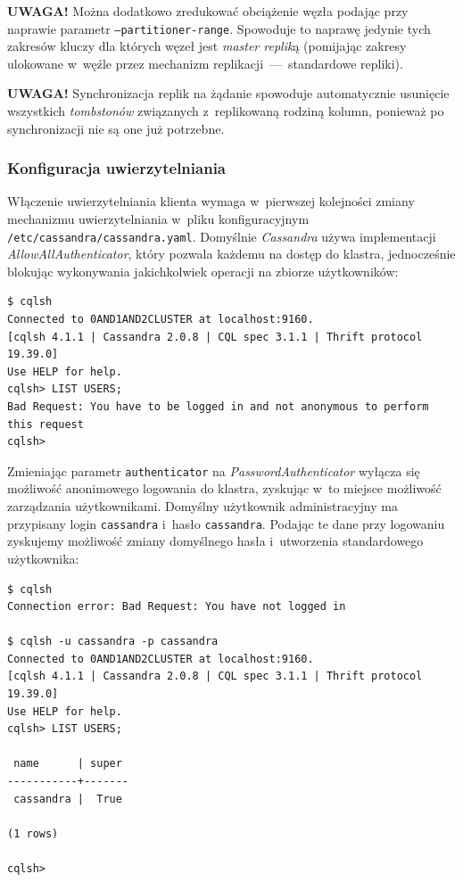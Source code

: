 \documentclass{article} %
\begin{document}
\bigskip

\noindent\textbf{UWAGA!} Można dodatkowo zredukować obciążenie węzła podając przy naprawie parametr \texttt{--partitioner-range}.
Spowoduje to naprawę jedynie tych zakresów kluczy dla których węzeł jest \emph{master replik}ą (pomijając zakresy ulokowane w~węźle przez mechanizm replikacji~---~standardowe repliki).

\noindent\textbf{UWAGA!} Synchronizacja replik na żądanie spowoduje automatycznie usunięcie wszystkich \emph{tombstonów} związanych z~replikowaną rodziną kolumn, ponieważ po synchronizacji nie są one już potrzebne.

\subsubsection{Konfiguracja uwierzytelniania}\label{subsec:cluster_misc_auth}

Włączenie uwierzytelniania klienta wymaga w~pierwszej kolejności zmiany mechanizmu uwierzytelniania w~pliku konfiguracyjnym \texttt{/etc/cassandra/cassandra.yaml}.
Domyślnie \emph{Cassandra} używa implementacji \emph{AllowAllAuthenticator}, który pozwala każdemu na dostęp do klastra, jednocześnie blokując wykonywania jakichkolwiek operacji na zbiorze użytkowników:

\begin{lstlisting}[style=bash, caption={wypisanie listy zdefiniowanych użytkowników przy wyłączonym uwierzytelnianiu}]
$ cqlsh
Connected to 0AND1AND2CLUSTER at localhost:9160.
[cqlsh 4.1.1 | Cassandra 2.0.8 | CQL spec 3.1.1 | Thrift protocol 19.39.0]
Use HELP for help.
cqlsh> LIST USERS;
Bad Request: You have to be logged in and not anonymous to perform this request
cqlsh>
\end{lstlisting}

Zmieniając parametr \texttt{authenticator} na \emph{PasswordAuthenticator} wyłącza się możliwość anonimowego logowania do klastra, zyskując w~to miejsce możliwość zarządzania użytkownikami.
Domyślny użytkownik administracyjny ma przypisany login \texttt{cassandra} i~hasło \texttt{cassandra}.
Podając te dane przy logowaniu zyskujemy możliwość zmiany domyślnego hasła i~utworzenia standardowego użytkownika:

\begin{lstlisting}[style=bash, caption={włączenie uwierzytelniania przy dostępie do klastra przez \texttt{cqlsh}}]
$ cqlsh
Connection error: Bad Request: You have not logged in

$ cqlsh -u cassandra -p cassandra
Connected to 0AND1AND2CLUSTER at localhost:9160.
[cqlsh 4.1.1 | Cassandra 2.0.8 | CQL spec 3.1.1 | Thrift protocol 19.39.0]
Use HELP for help.
cqlsh> LIST USERS;

 name      | super
-----------+-------
 cassandra |  True

(1 rows)

cqlsh>
\end{lstlisting}
\end{document}
